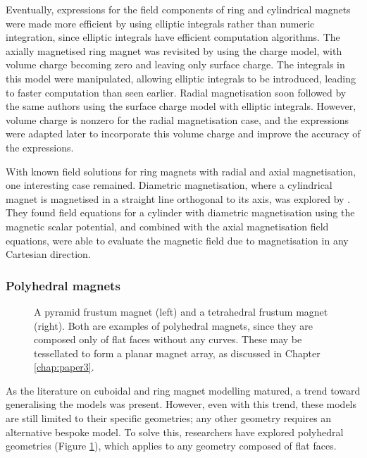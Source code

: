 Eventually, expressions for the field components of ring and cylindrical magnets were made more efficient by using elliptic integrals rather than numeric integration, since elliptic integrals have efficient computation algorithms. The axially magnetised ring magnet was revisited by \textcite{Ravaud2008} using the charge model, with volume charge becoming zero and leaving only surface charge. The integrals in this model were manipulated, allowing elliptic integrals to be introduced, leading to faster computation than seen earlier. Radial magnetisation soon followed by the same authors \cite{Ravaud2008a} using the surface charge model with elliptic integrals. However, volume charge is nonzero for the radial magnetisation case, and the expressions were adapted later \cite{Ravaud2009a} to incorporate this volume charge and improve the accuracy of the expressions.

With known field solutions for ring magnets with radial and axial magnetisation, one interesting case remained. Diametric magnetisation, where a cylindrical magnet is magnetised in a straight line orthogonal to its axis, was explored by \textcite{Caciagli2018}. They found field equations for a cylinder with diametric magnetisation using the magnetic scalar potential, and combined with the axial magnetisation field equations, were able to evaluate the magnetic field due to magnetisation in any Cartesian direction.

\subsubsection{Polyhedral magnets}
\begin{figure}
    \centering
    \hfill
    \begin{subfigure}{0.4\textwidth}
        
    \end{subfigure}
    \hfill
    \begin{subfigure}{0.4\textwidth}
        
    \end{subfigure}
    \hfill
    \caption{A pyramid frustum magnet (left) and a tetrahedral frustum magnet (right). Both are examples of polyhedral magnets, since they are composed only of flat faces without any curves. These may be tessellated to form a planar magnet array, as discussed in Chapter \ref{chap:paper3}.}
    \label{fig:polyhedralMagnetSchematic}
\end{figure}

As the literature on cuboidal and ring magnet modelling matured, a trend toward generalising the models was present. However, even with this trend, these models are still limited to their specific geometries; any other geometry requires an alternative bespoke model. To solve this, researchers have explored polyhedral geometries (Figure \ref{fig:polyhedralMagnetSchematic}), which applies to any geometry composed of flat faces.

